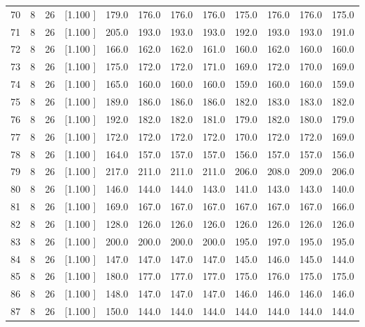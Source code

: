 \documentclass[12pt,a4paper]{article}
\begin{document}
\begin{center}
{\begin{tabular}{r r r r r r r r r r r r}
  70&  8& 26&[1.100     ]&   179.0&   176.0&   176.0&   176.0&   175.0&   176.0&   176.0&   175.0\\[-0.02in]
  71&  8& 26&[1.100     ]&   205.0&   193.0&   193.0&   193.0&   192.0&   193.0&   193.0&   191.0\\[-0.02in]
  72&  8& 26&[1.100     ]&   166.0&   162.0&   162.0&   161.0&   160.0&   162.0&   160.0&   160.0\\[-0.02in]
  73&  8& 26&[1.100     ]&   175.0&   172.0&   172.0&   171.0&   169.0&   172.0&   170.0&   169.0\\[-0.02in]
  74&  8& 26&[1.100     ]&   165.0&   160.0&   160.0&   160.0&   159.0&   160.0&   160.0&   159.0\\[-0.02in]
  75&  8& 26&[1.100     ]&   189.0&   186.0&   186.0&   186.0&   182.0&   183.0&   183.0&   182.0\\[-0.02in]
  76&  8& 26&[1.100     ]&   192.0&   182.0&   182.0&   181.0&   179.0&   182.0&   180.0&   179.0\\[-0.02in]
  77&  8& 26&[1.100     ]&   172.0&   172.0&   172.0&   172.0&   170.0&   172.0&   172.0&   169.0\\[-0.02in]
  78&  8& 26&[1.100     ]&   164.0&   157.0&   157.0&   157.0&   156.0&   157.0&   157.0&   156.0\\[-0.02in]
  79&  8& 26&[1.100     ]&   217.0&   211.0&   211.0&   211.0&   206.0&   208.0&   209.0&   206.0\\[-0.02in]
  80&  8& 26&[1.100     ]&   146.0&   144.0&   144.0&   143.0&   141.0&   143.0&   143.0&   140.0\\[-0.02in]
  81&  8& 26&[1.100     ]&   169.0&   167.0&   167.0&   167.0&   167.0&   167.0&   167.0&   166.0\\[-0.02in]
  82&  8& 26&[1.100     ]&   128.0&   126.0&   126.0&   126.0&   126.0&   126.0&   126.0&   126.0\\[-0.02in]
  83&  8& 26&[1.100     ]&   200.0&   200.0&   200.0&   200.0&   195.0&   197.0&   195.0&   195.0\\[-0.02in]
  84&  8& 26&[1.100     ]&   147.0&   147.0&   147.0&   147.0&   145.0&   146.0&   145.0&   144.0\\[-0.02in]
  85&  8& 26&[1.100     ]&   180.0&   177.0&   177.0&   177.0&   175.0&   176.0&   175.0&   175.0\\[-0.02in]
  86&  8& 26&[1.100     ]&   148.0&   147.0&   147.0&   147.0&   146.0&   146.0&   146.0&   146.0\\[-0.02in]
  87&  8& 26&[1.100     ]&   150.0&   144.0&   144.0&   144.0&   144.0&   144.0&   144.0&   144.0\\[-0.02in]

\end{tabular}}
\end{center}
\end{document}
